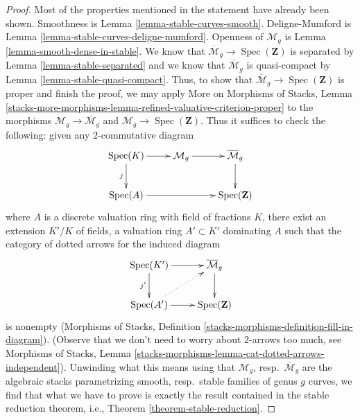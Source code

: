 \documentclass{stacks-project}
\theoremstyle{plain}
\theoremstyle{definition}
\theoremstyle{remark}
\numberwithin{equation}{subsection}
\def\Spec{\mathop{\mathrm{Spec}}}
\begin{document}
\begin{proof}
Most of the properties mentioned in the statement have already been shown.
Smoothness is Lemma \ref{lemma-stable-curves-smooth}.
Deligne-Mumford is Lemma \ref{lemma-stable-curves-deligne-mumford}.
Openness of $\mathcal{M}_g$ is Lemma \ref{lemma-smooth-dense-in-stable}.
We know that $\overline{\mathcal{M}}_g \to \Spec(\mathbf{Z})$
is separated by Lemma \ref{lemma-stable-separated} and we know that
$\overline{\mathcal{M}}_g$ is quasi-compact by
Lemma \ref{lemma-stable-quasi-compact}.
Thus, to show that $\overline{\mathcal{M}}_g \to \Spec(\mathbf{Z})$
is proper and finish the proof, we may apply
More on Morphisms of Stacks, Lemma
\ref{stacks-more-morphisms-lemma-refined-valuative-criterion-proper}
to the morphisms $\mathcal{M}_g \to \overline{\mathcal{M}}_g$ and
$\overline{\mathcal{M}}_g \to \Spec(\mathbf{Z})$.
Thus it suffices to check the following: given any $2$-commutative diagram
$$
\xymatrix{
\Spec(K) \ar[r] \ar[d]_j &
\mathcal{M}_g \ar[r] &
\overline{\mathcal{M}}_g \ar[d] \\
\Spec(A) \ar[rr] & & \Spec(\mathbf{Z})
}
$$
where $A$ is a discrete valuation ring with field of fractions $K$, there
exist an extension $K'/K$ of fields, a valuation ring $A' \subset K'$
dominating $A$ such that the category of dotted arrows for the
induced diagram
$$
\xymatrix{
\Spec(K') \ar[r] \ar[d]_{j'} & \overline{\mathcal{M}}_g \ar[d] \\
\Spec(A') \ar[r] \ar@{..>}[ru] & \Spec(\mathbf{Z})
}
$$
is nonempty (Morphisms of Stacks, Definition
\ref{stacks-morphisms-definition-fill-in-diagram}).
(Observe that we don't need to worry about
$2$-arrows too much, see Morphisms of Stacks, Lemma
\ref{stacks-morphisms-lemma-cat-dotted-arrows-independent}).
Unwinding what this means using that
$\mathcal{M}_g$, resp.\ $\overline{\mathcal{M}}_g$ are the algebraic
stacks parametrizing smooth, resp.\ stable families of genus $g$ curves,
we find that what we have to prove is exactly the result contained
in the stable reduction theorem, i.e., Theorem
\ref{theorem-stable-reduction}.
\end{proof}















\end{document}
